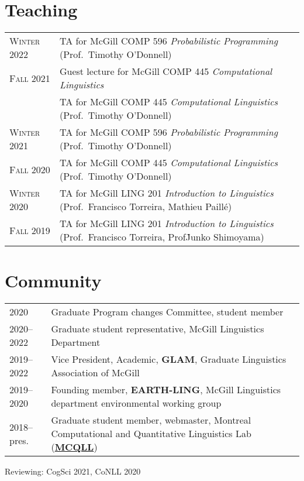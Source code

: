 \documentclass[11pt,a4paper]{article}
\begin{document}
  \section{Teaching}
  \begin{longtable}{p{1.7cm}|p{15cm}}
    \textsc{Winter 2022}&%
    TA for McGill COMP 596 \emph{Probabilistic Programming} (Prof.\ Timothy
    O'Donnell)\\
    \textsc{Fall 2021}&%
    Guest lecture for McGill COMP 445 \emph{Computational Linguistics}\\
                      & TA for McGill COMP 445 \emph{Computational Linguistics}
                      (Prof.\ Timothy O'Donnell)\\
    \textsc{Winter 2021}&%
    TA for McGill COMP 596 \emph{Probabilistic Programming} (Prof.\ Timothy
    O'Donnell)\\
    \textsc{Fall 2020}&%
    TA for McGill COMP 445 \emph{Computational Linguistics} (Prof.\ Timothy
    O'Donnell)\\
    \textsc{Winter 2020}&%
    TA for McGill LING 201 \emph{Introduction to Linguistics} (Prof.\ Francisco
    Torreira, Mathieu Paillé)\\
    \textsc{Fall 2019}&%
    TA for McGill LING 201 \emph{Introduction to Linguistics} (Prof.\ Francisco
    Torreira, Prof\. Junko Shimoyama)\\
  \end{longtable}

  \section{Community}
  \begin{longtable}{p{1.7cm}|p{15cm}}
    2020
    &%
    Graduate Program changes Committee, student member\\
    \textsc{2020--2022}
    &%
    Graduate student representative, McGill Linguistics Department\\
    \textsc{2019--2022}
    &%
    Vice President, Academic, \textbf{GLAM}, Graduate Linguistics Association of
    McGill\\
    \textsc{2019--2020}&%
    Founding member, \textbf{EARTH-LING}, McGill Linguistics department
    environmental working group\\
    \textsc{2018--}pres.
    &%
    Graduate student member, webmaster, Montreal Computational and Quantitative
    Linguistics Lab (\href{http://mcqll.org}{\textbf{MCQLL}})\\
  \end{longtable}
  Reviewing: CogSci 2021, CoNLL 2020
\end{document}
